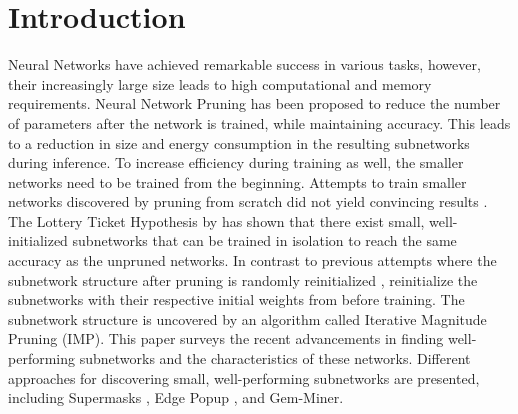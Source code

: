 \section{Introduction}
Neural Networks have achieved remarkable success in various tasks, however, their increasingly large size leads to high computational and memory requirements.
Neural Network Pruning \autocite{LeCun, OptimalBrainSurgeon, HanEtAl15, PruningFiltersForEfficientConvets} has been proposed to reduce the number of parameters after the network is trained, while maintaining accuracy.
This leads to a reduction in size \autocite{HanEtAl15} and energy consumption \autocite{YangCS17} in the resulting subnetworks during inference.
To increase efficiency during training as well, the smaller networks need to be trained from the beginning. Attempts to train smaller networks discovered by pruning from scratch did not yield convincing results \autocite{HanEtAl15, PruningFiltersForEfficientConvets}.
The Lottery Ticket Hypothesis by \textcite{DBLP:conf/iclr/FrankleC19} has shown that there exist small, well-initialized subnetworks that can be trained in isolation to reach the same accuracy as the unpruned networks. 
In contrast to previous attempts where the subnetwork structure after pruning is randomly reinitialized \autocite{HanEtAl15, PruningFiltersForEfficientConvets}, \textcite{DBLP:conf/iclr/FrankleC19} reinitialize the subnetworks with their respective initial weights from before training.
The subnetwork structure is uncovered by an algorithm called Iterative Magnitude Pruning (IMP).
This paper surveys the recent advancements in finding well-performing subnetworks and the characteristics of these networks. Different approaches for discovering small, well-performing subnetworks are presented, including Supermasks \autocite{DBLP:conf/nips/ZhouLLY19}, Edge Popup \autocite{DBLP:conf/cvpr/RamanujanWKFR20}, and Gem-Miner\autocite{RareGems}.
